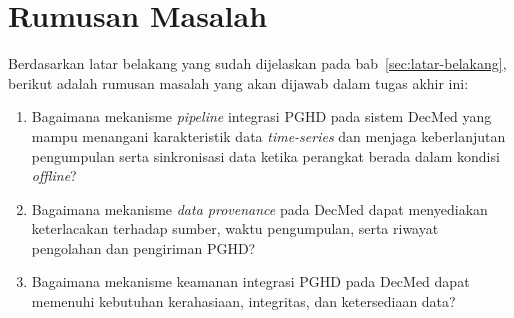 \section{Rumusan Masalah}

Berdasarkan latar belakang yang sudah dijelaskan pada bab~\ref{sec:latar-belakang}, berikut adalah rumusan masalah yang akan dijawab dalam tugas akhir ini:

\begin{enumerate}
  \item Bagaimana mekanisme \textit{pipeline} integrasi PGHD pada sistem DecMed yang mampu menangani karakteristik data \textit{time-series} dan menjaga keberlanjutan pengumpulan serta sinkronisasi data ketika perangkat berada dalam kondisi \textit{offline}?
 
  \item Bagaimana mekanisme \textit{data provenance} pada DecMed dapat menyediakan keterlacakan terhadap sumber, waktu pengumpulan, serta riwayat pengolahan dan pengiriman PGHD\@?
 
  \item Bagaimana mekanisme keamanan integrasi PGHD pada DecMed dapat memenuhi kebutuhan kerahasiaan, integritas, dan ketersediaan data? 
\end{enumerate}
